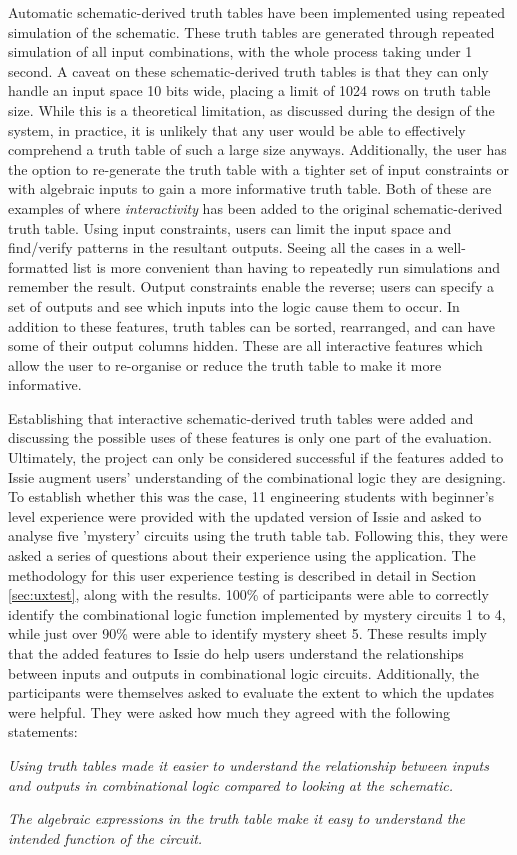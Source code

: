 Automatic schematic-derived truth tables have been implemented using repeated simulation of the schematic. These truth tables are generated through repeated simulation of all input combinations, with the whole process taking under 1 second. A caveat on these schematic-derived truth tables is that they can only handle an input space 10 bits wide, placing a limit of 1024 rows on truth table size. While this is a theoretical limitation, as discussed during the design of the system, in practice, it is unlikely that any user would be able to effectively comprehend a truth table of such a large size anyways. Additionally, the user has the option to re-generate the truth table with a tighter set of input constraints or with algebraic inputs to gain a more informative truth table. Both of these are examples of where \textit{interactivity} has been added to the original schematic-derived truth table. Using input constraints, users can limit the input space and find/verify patterns in the resultant outputs. Seeing all the cases in a well-formatted list is more convenient than having to repeatedly run simulations and remember the result. Output constraints enable the reverse; users can specify a set of outputs and see which inputs into the logic cause them to occur. In addition to these features, truth tables can be sorted, rearranged, and can have some of their output columns hidden. These are all interactive features which allow the user to re-organise or reduce the truth table to make it more informative.

Establishing that interactive schematic-derived truth tables were added and discussing the possible uses of these features is only one part of the evaluation. Ultimately, the project can only be considered successful if the features added to Issie augment users' understanding of the combinational logic they are designing. To establish whether this was the case, 11 engineering students with beginner's level experience were provided with the updated version of Issie and asked to analyse five 'mystery' circuits using the truth table tab. Following this, they were asked a series of questions about their experience using the application. The methodology for this user experience testing is described in detail in Section \ref{sec:uxtest}, along with the results. 100\% of participants were able to correctly identify the combinational logic function implemented by mystery circuits 1 to 4, while just over 90\% were able to identify mystery sheet 5. These results imply that the added features to Issie do help users understand the relationships between inputs and outputs in combinational logic circuits. Additionally, the participants were themselves asked to evaluate the extent to which the updates were helpful. They were asked how much they agreed with the following statements:
\begin{center}
    \textit{Using truth tables made it easier to understand the relationship between inputs and outputs in combinational logic compared to looking at the schematic.} 
    
    \textit{The algebraic expressions in the truth table make it easy to understand the intended function of the circuit.}
\end{center}

